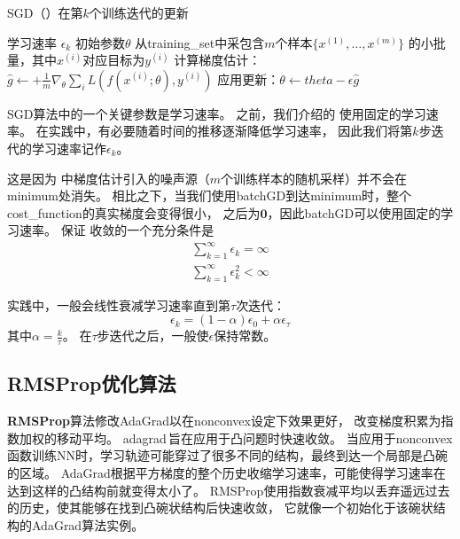 \begin{algorithm}[ht]
	\caption{\gls{SGD}（）在第$k$个训练迭代的更新}
	\label{alg:sgd}
	\begin{algorithmic}
		\REQUIRE 学习速率 $\epsilon_k$
		\REQUIRE 初始参数$\theta$
		\STATE 从\gls{training_set}中采包含$m$个样本$\{ x^{(1)},\dots, x^{(m)}\}$ 的小批量，其中$x^{(i)}$对应目标为$y^{(i)}$
		\STATE 计算梯度估计： $\hat{g} \leftarrow + 
		\frac{1}{m} \nabla_{\theta} \sum_i L(f(x^{(i)};\theta),y^{(i)})$
		\STATE 应用更新：$\theta \leftarrow theta - \epsilon \hat{g}$
		\ENDWHILE
	\end{algorithmic}
\end{algorithm}

SGD算法中的一个关键参数是学习速率。
之前，我们介绍的\,\,使用固定的学习速率。
在实践中，有必要随着时间的推移逐渐降低学习速率，
因此我们将第$k$步迭代的学习速率记作$\epsilon_k$。

这是因为\,\,中梯度估计引入的噪声源（$m$个训练样本的随机采样）并不会在\gls{minimum}处消失。
相比之下，当我们使用\gls{batch}\gls{GD}到达\gls{minimum}时，整个\gls{cost_function}的真实梯度会变得很小，
之后为$\mathbf{0}$，因此\gls{batch}\gls{GD}可以使用固定的学习速率。
保证\,\,收敛的一个充分条件是
\begin{equation}
\label{eq:8.12}
	\begin{aligned}
		\sum_{k=1}^\infty \epsilon_k = \infty\\
		\sum_{k=1}^\infty \epsilon_k^2 < \infty
	\end{aligned}
\end{equation}

实践中，一般会线性衰减学习速率直到第$\tau$次迭代：
\begin{equation}
\label{eq:8.14}
\epsilon_k = (1-\alpha) \epsilon_0 + \alpha \epsilon_\tau
\end{equation}
其中$\alpha = \frac{k}{\tau}$。
在$\tau$步迭代之后，一般使$\epsilon$保持常数。

\subsection{RMSProp优化算法}
\label{sec:rmsprop}
\textbf{RMSProp}算法修改AdaGrad以在\gls{nonconvex}设定下效果更好，
改变梯度积累为指数加权的移动平均。
\gls{adagrad}\,旨在应用于凸问题时快速收敛。
当应用于\gls{nonconvex}函数训练\gls{NN}时，学习轨迹可能穿过了很多不同的结构，最终到达一个局部是凸碗的区域。
AdaGrad根据平方梯度的整个历史收缩学习速率，可能使得学习速率在达到这样的凸结构前就变得太小了。
RMSProp使用指数衰减平均以丢弃遥远过去的历史，使其能够在找到凸碗状结构后快速收敛，
它就像一个初始化于该碗状结构的AdaGrad算法实例。

